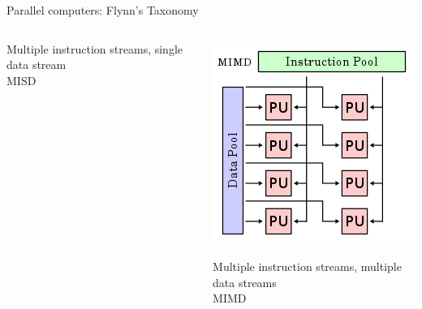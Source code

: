 \documentclass{beamer}
\begin{document}
\begin{frame}{Parallel computers: Flynn's Taxonomy}
\begin{itemize}
\begin{columns}
\begin{column}{0.25\columnwidth}
	Multiple instruction streams, single data stream\\MISD
\end{column}
\begin{column}{0.25\columnwidth}
					\centering
			\small
	\includegraphics[width=\columnwidth]{MIMD.png}			
	
	\alert<6->{Multiple instruction streams, multiple data streams\\MIMD}
\end{column}
	\end{columns}
\end{itemize}
\end{frame}
\end{document}

